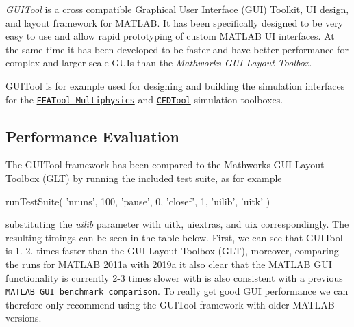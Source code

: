 

{\itshape G\+U\+I\+Tool} is a cross compatible Graphical User Interface (G\+UI) Toolkit, UI design, and layout framework for M\+A\+T\+L\+AB. It has been specifically designed to be very easy to use and allow rapid prototyping of custom M\+A\+T\+L\+AB UI interfaces. At the same time it has been developed to be faster and have better performance for complex and larger scale G\+U\+Is than the {\itshape Mathworks G\+UI Layout Toolbox}.

G\+U\+I\+Tool is for example used for designing and building the simulation interfaces for the \href{https://www.featool.com}{\tt F\+E\+A\+Tool Multiphysics} and \href{https://www.cfdtool.com}{\tt C\+F\+D\+Tool} simulation toolboxes.

\subsection*{Performance Evaluation }

The G\+U\+I\+Tool framework has been compared to the Mathworks G\+UI Layout Toolbox (G\+LT) by running the included test suite, as for example \begin{DoxyVerb}runTestSuite( 'nruns', 100, 'pause', 0, 'closef', 1, 'uilib', 'uitk' )
\end{DoxyVerb}


substituting the {\itshape uilib} parameter with {\ttfamily uitk}, {\ttfamily uiextras}, and {\ttfamily uix} correspondingly. The resulting timings can be seen in the table below. First, we can see that G\+U\+I\+Tool is 1.-\/2. times faster than the G\+UI Layout Toolbox (G\+LT), moreover, comparing the runs for M\+A\+T\+L\+AB 2011a with 2019a it also clear that the M\+A\+T\+L\+AB G\+UI functionality is currently 2-\/3 times slower with is also consistent with a previous \href{https://www.precisesimulation.com/blog/2019-08-20-benchmarking-and-performance-comparison-of-matlab-versions}{\tt M\+A\+T\+L\+AB G\+UI benchmark comparison}. To really get good G\+UI performance we can therefore only recommend using the G\+U\+I\+Tool framework with older M\+A\+T\+L\+AB versions.

